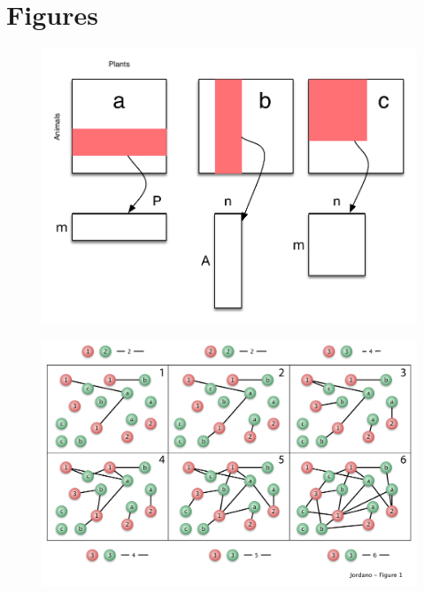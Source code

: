 \documentclass[12pt]{article}
\begin{document}
\section*{Figures}
\begin{figure}[htb!]
  \caption{}
  \label{Fig1}
  \begin{center}
    \includegraphics[width=17cm]{../figures/Fig1.pdf}
  \end{center}
\end{figure}
\newpage
\begin{figure}[htb!]
  \caption{}
  \label{Fig2}
  \begin{center}
    \includegraphics[width=17cm]{../figures/Fig2.pdf}
  \end{center}
\end{figure}
\end{document}
